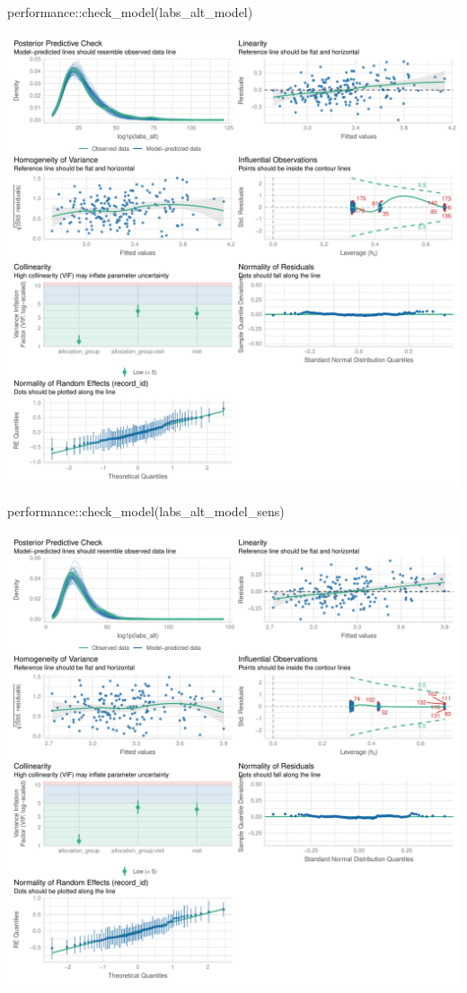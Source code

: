 \documentclass[
  12pt,
]{article}
\newenvironment{Shaded}{\begin{snugshade}}{\end{snugshade}}
\newcommand{\FunctionTok}[1]{\textcolor[rgb]{0.28,0.35,0.67}{#1}}
\newcommand{\NormalTok}[1]{\textcolor[rgb]{0.00,0.23,0.31}{#1}}
\newcommand{\SpecialCharTok}[1]{\textcolor[rgb]{0.37,0.37,0.37}{#1}}
\begin{document}
\begin{Shaded}
\begin{Highlighting}[]
\NormalTok{performance}\SpecialCharTok{::}\FunctionTok{check\_model}\NormalTok{(labs\_alt\_model)}
\end{Highlighting}
\end{Shaded}

\includegraphics{Outcomes_files/figure-pdf/labs_alt_4-1.pdf}

\begin{Shaded}
\begin{Highlighting}[]
\NormalTok{performance}\SpecialCharTok{::}\FunctionTok{check\_model}\NormalTok{(labs\_alt\_model\_sens)}
\end{Highlighting}
\end{Shaded}

\includegraphics{Outcomes_files/figure-pdf/labs_alt_4-2.pdf}
\end{document}
